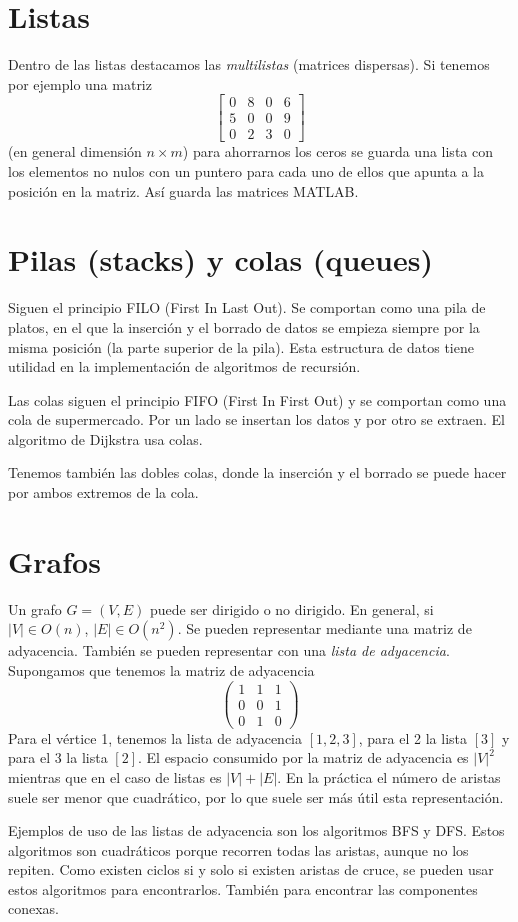 \documentclass[AL.tex]{subfiles}
\begin{document}
\section{Listas}

Dentro de las listas destacamos las \emph{multilistas} (matrices dispersas). Si tenemos por ejemplo una matriz $$\begin{bmatrix}
0 & 8 & 0 & 6\\
5 & 0 & 0 & 9\\
0 & 2 & 3 & 0
\end{bmatrix}$$
(en general dimensión $n\times m$) para ahorrarnos los ceros se guarda una lista con los elementos no nulos con un puntero para cada uno de ellos que apunta a la posición en la matriz. Así guarda las matrices MATLAB. 



\section{Pilas (stacks) y colas (queues)}
Siguen el principio FILO (First In Last Out). Se comportan como una pila de platos, en el que la inserción y el borrado de datos se empieza siempre por la misma posición (la parte superior de la pila). Esta estructura de datos tiene utilidad en la implementación de algoritmos de recursión.

Las colas siguen el principio FIFO (First In First Out) y se comportan como una cola de supermercado. Por un lado se insertan los datos y por otro se extraen. El algoritmo de Dijkstra usa colas. 

Tenemos también las dobles colas, donde la inserción y el borrado se puede hacer por ambos extremos de la cola. 

\section{Grafos}
Un grafo $G=(V,E)$ puede ser dirigido o no dirigido. En general, si $|V|\in O(n)$, $|E|\in O(n^2)$. Se pueden representar mediante una matriz de adyacencia. También se pueden representar con una \emph{lista de adyacencia}. Supongamos que tenemos la matriz de adyacencia 
$$\begin{pmatrix}
1 & 1 & 1\\
0 & 0 & 1\\
0 & 1 & 0
\end{pmatrix}$$
Para el vértice 1, tenemos la lista de adyacencia $[1,2,3]$, para el 2 la lista $[3]$ y para el 3 la lista $[2]$. El espacio consumido por la matriz de adyacencia es $|V|^2$ mientras que en el caso de listas es $|V|+|E|$. En la práctica el número de aristas suele ser menor que cuadrático, por lo que suele ser más útil esta representación. 

Ejemplos de uso de las listas de adyacencia son los algoritmos BFS y DFS. Estos algoritmos son cuadráticos porque recorren todas las aristas, aunque no los repiten. Como existen ciclos si y solo si existen aristas de cruce, se pueden usar estos algoritmos para encontrarlos. También para encontrar las componentes conexas.
\end{document}
